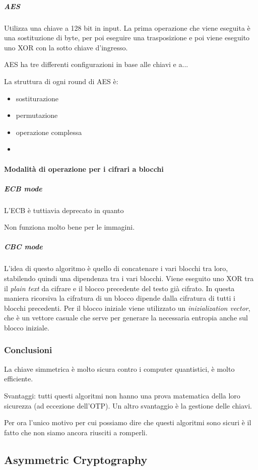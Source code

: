\subparagraph{AES}

Utilizza una chiave a 128 bit in input. La prima operazione che viene eseguita è 
una sostituzione di byte, per poi eseguire una trasposizione e poi viene 
eseguito uno XOR con la sotto chiave d'ingresso.


AES ha tre differenti configurazioni in base alle chiavi e a... 


La struttura di ogni round di AES è:
\begin{itemize}
 \item sostiturazione
 \item permutazione
 \item operazione complessa
 \item {}
\end{itemize}

\paragraph{Modalità di operazione per i cifrari a blocchi}


\subparagraph{ECB mode}


L'ECB è tuttiavia deprecato in quanto 

Non funziona molto bene per le immagini.

\subparagraph{CBC mode}

L'idea di questo algoritmo è quello di concatenare i vari blocchi tra loro, 
stabilendo quindi una dipendenza tra i vari blocchi. Viene eseguito uno XOR tra 
il \textit{plain text} da cifrare e il blocco precedente del testo già cifrato. 
In questa maniera ricorsiva la cifratura di un blocco dipende dalla cifratura di 
tutti i blocchi precedenti. Per il blocco iniziale viene utilizzato un 
\textit{inizialization vector}, che è un vettore casuale che serve per generare 
la necessaria entropia anche sul blocco iniziale.


\subsubsection{Conclusioni}

La chiave simmetrica è molto sicura contro i computer quantistici, è molto 
efficiente.

Svantaggi: tutti questi algoritmi non hanno una prova matematica della loro 
sicurezza (ad eccezione dell'OTP). Un altro svantaggio è la gestione delle 
chiavi.

Per ora l'unico motivo per cui possiamo dire che questi algoritmi sono sicuri è 
il fatto che non siamo ancora riusciti a romperli.

\subsection{Asymmetric Cryptography}

